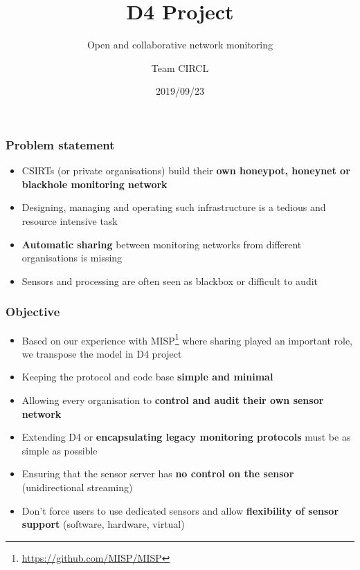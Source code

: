 \documentclass{beamer}
\title{D4 Project}
\subtitle{Open and collaborative network monitoring}
\author{Team CIRCL}
\institute{\url{https://www.d4-project.org/}}
\date{2019/09/23}
\begin{document}
    \begin{frame}
        \maketitle
    \end{frame}

\begin{frame}
        \frametitle{Problem statement}
        \begin{itemize}
                \item CSIRTs (or private organisations) build their {\bf own honeypot, honeynet or blackhole monitoring network}
                \item Designing, managing and operating such infrastructure is a tedious and resource intensive task
                \item {\bf Automatic sharing} between monitoring networks from different organisations is missing
                \item Sensors and processing are often seen as blackbox or difficult to audit

        \end{itemize}
\end{frame}


\begin{frame}
 \frametitle{Objective}
 \begin{itemize}
         \item Based on our experience with MISP\footnote{\url{https://github.com/MISP/MISP}} where sharing played an important role, we transpose
                 the model in D4 project
         \item Keeping the protocol and code base {\bf simple and minimal}
         \item Allowing every organisation to {\bf control and audit their own sensor network}
         \item Extending D4 or {\bf encapsulating legacy monitoring protocols} must be as simple as possible
         \item Ensuring that the sensor server has {\bf no control on the sensor} (unidirectional streaming)
         \item Don't force users to use dedicated sensors and allow {\bf flexibility of sensor support} (software, hardware, virtual)

 \end{itemize}
\end{frame}
\end{document}
